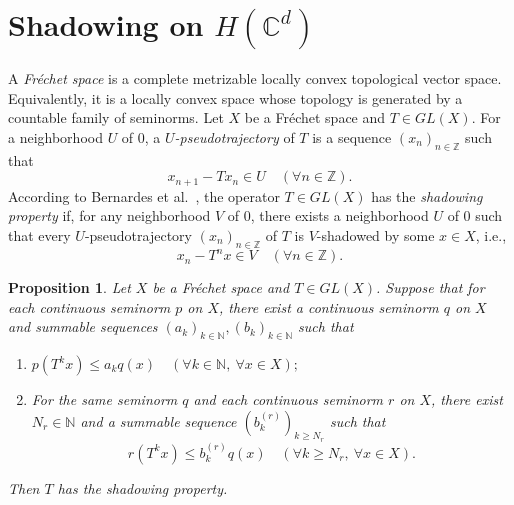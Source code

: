\documentclass[11pt]{amsart}
\newtheorem{proposition}{Proposition}
\theoremstyle{definition}
\theoremstyle{remark}
\theoremstyle{plain}
\begin{document}
\section[Shadowing on H(Cd)]{Shadowing on \(H(\mathbb{C}^d)\)}
\label{Sec:2}
A \textit{Fr\'{e}chet space} is a complete metrizable locally convex topological vector space.
Equivalently, it is a locally convex space whose topology is generated by a
countable family of seminorms.
Let $X$ be a Fr\'echet space and \(T\in GL(X)\). For
a neighborhood \(U\) of \(0\), a \textit{\(U\)-pseudotrajectory} of \(T\)
is a sequence \((x_n)_{n\in\mathbb{Z}}\) such that
\[
x_{n+1}-Tx_n\in U
\quad (\forall n\in\mathbb{Z}).
\]
According to
Bernardes et al.~\cite{BCDFP}, the operator \(T\in GL(X)\) has the
\textit{shadowing property}
if, for any neighborhood \(V\) of \(0\), there exists a neighborhood \(U\) of
\(0\) such that every \(U\)-pseudotrajectory \((x_n)_{n\in\mathbb{Z}}\) of
$T$ is $V$-shadowed by some $x\in X$, i.e.,
\[
x_n-T^n x\in V
\quad(\forall n\in\mathbb{Z}).
\]

\begin{proposition}\label{prop:shadowing-sufficient-condition}
Let $X$ be a Fr\'echet space and \(T\in GL(X)\).
Suppose that for each continuous seminorm \(p\) on \(X\), there exist
a continuous seminorm \(q\) on \(X\) and summable sequences
\((a_k)_{k\in\mathbb{N}}, (b_k)_{k\in\mathbb{N}}\) such that
\begin{enumerate}[{\rm (i)}]
\item
\(
p(T^k x)\le a_k q(x)
\quad(\forall k\in\mathbb{N},\ \forall x\in X);
\)
\item
For the same seminorm \(q\) and each continuous seminorm \(r\) on \(X\),
there exist \(N_r\in\mathbb{N}\) and a summable sequence
\((b_k^{(r)})_{k\ge N_r}\) such that
\[
r(T^k x)\le b_k^{(r)}q(x)
\quad(\forall k\ge N_r,\ \forall x\in X).
\]
\end{enumerate}
Then \(T\) has the shadowing property.
\end{proposition}
\end{document}
